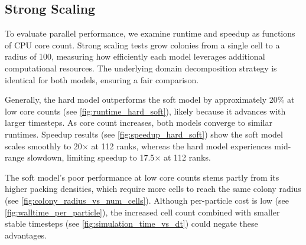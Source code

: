 \documentclass[conference]{IEEEtran}
\begin{document}
\subsection{Strong Scaling}
\label{sec:strong_scaling}

To evaluate parallel performance, we examine runtime and speedup as functions of CPU core count. Strong scaling tests grow colonies from a single cell to a radius of 100, measuring how efficiently each model leverages additional computational resources. The underlying domain decomposition strategy is identical for both models, ensuring a fair comparison.

Generally, the hard model outperforms the soft model by approximately 20\% at low core counts (see \autoref{fig:runtime_hard_soft}), likely because it advances with larger timesteps. As core count increases, both models converge to similar runtimes. Speedup results (see \autoref{fig:speedup_hard_soft}) show the soft model scales smoothly to 20$\times$ at 112 ranks, whereas the hard model experiences mid-range slowdown, limiting speedup to 17.5$\times$ at 112 ranks.

The soft model's poor performance at low core counts stems partly from its higher packing densities, which require more cells to reach the same colony radius (see \autoref{fig:colony_radius_vs_num_cells}). Although per-particle cost is low (see \autoref{fig:walltime_per_particle}), the increased cell count combined with smaller stable timesteps (see \autoref{fig:simulation_time_vs_dt}) could negate these advantages.
\end{document}
